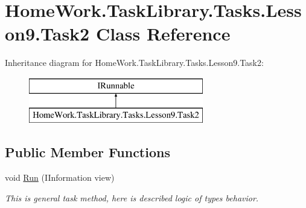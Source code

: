 \hypertarget{class_home_work_1_1_task_library_1_1_tasks_1_1_lesson9_1_1_task2}{}\section{Home\+Work.\+Task\+Library.\+Tasks.\+Lesson9.\+Task2 Class Reference}
\label{class_home_work_1_1_task_library_1_1_tasks_1_1_lesson9_1_1_task2}
Inheritance diagram for Home\+Work.\+Task\+Library.\+Tasks.\+Lesson9.\+Task2\+:\begin{figure}[H]
\begin{center}
\leavevmode
\includegraphics[height=2.000000cm]{class_home_work_1_1_task_library_1_1_tasks_1_1_lesson9_1_1_task2}
\end{center}
\end{figure}
\subsection*{Public Member Functions}
\begin{DoxyCompactItemize}
\item 
void \mbox{\hyperlink{class_home_work_1_1_task_library_1_1_tasks_1_1_lesson9_1_1_task2_a11f5ab4b6fad45fa03133e170ef75044}{Run}} (I\+Information view)
\begin{DoxyCompactList}\small\item\em This is general task method, here is described logic of types behavior. \end{DoxyCompactList}\end{DoxyCompactItemize}
